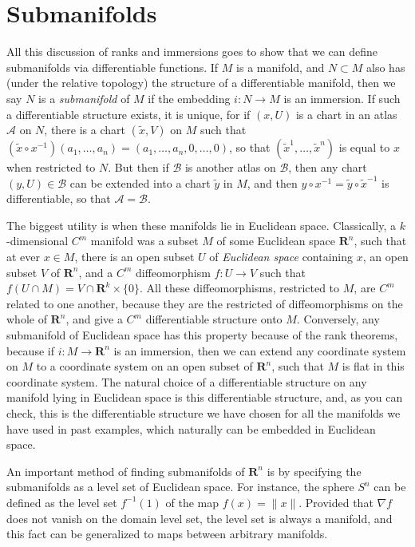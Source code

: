 \section{Submanifolds}

All this discussion of ranks and immersions goes to show that we can define submanifolds via differentiable functions. If $M$ is a manifold, and $N \subset M$ also has (under the relative topology) the structure of a differentiable manifold, then we say $N$ is a \emph{submanifold} of $M$ if the embedding $i: N \to M$ is an immersion. If such a differentiable structure exists, it is unique, for if $(x,U)$ is a chart in an atlas $\mathcal{A}$ on $N$, there is a chart $(\tilde{x},V)$ on $M$ such that $(\tilde{x} \circ x^{-1})(a_1, \dots, a_n) = (a_1, \dots, a_n, 0, \dots, 0)$, so that $(\tilde{x}^1, \dots, \tilde{x}^n)$ is equal to $x$ when restricted to $N$. But then if $\mathcal{B}$ is another atlas on $\mathcal{B}$, then any chart $(y,U) \in \mathcal{B}$ can be extended into a chart $\tilde{y}$ in $M$, and then $y \circ x^{-1} = \tilde{y} \circ \tilde{x}^{-1}$ is differentiable, so that $\mathcal{A} = \mathcal{B}$.

\begin{example}
    The biggest utility is when these manifolds lie in Euclidean space. Classically, a $k$-dimensional $C^m$ manifold was a subset $M$ of some Euclidean space $\mathbf{R}^n$, such that at ever $x \in M$, there is an open subset $U$ of {\it Euclidean space} containing $x$, an open subset $V$ of $\mathbf{R}^n$, and a $C^m$ diffeomorphism $f: U \to V$ such that $f(U \cap M) = V \cap \mathbf{R}^k \times \{ 0 \}$. All these diffeomorphisms, restricted to $M$, are $C^m$ related to one another, because they are the restricted of diffeomorphisms on the whole of $\mathbf{R}^n$, and give a $C^m$ differentiable structure onto $M$. Conversely, any submanifold of Euclidean space has this property because of the rank theorems, because if $i: M \to \mathbf{R}^n$ is an immersion, then we can extend any coordinate system on $M$ to a coordinate system on an open subset of $\mathbf{R}^n$, such that $M$ is flat in this coordinate system. The natural choice of a differentiable structure on any manifold lying in Euclidean space is this differentiable structure, and, as you can check, this is the differentiable structure we have chosen for all the manifolds we have used in past examples, which naturally can be embedded in Euclidean space.
\end{example}

An important method of finding submanifolds of $\mathbf{R}^n$ is by specifying the submanifolds as a level set of Euclidean space. For instance, the sphere $S^n$ can be defined as the level set $f^{-1}(1)$ of the map $f(x) = \| x \|$. Provided that $\nabla f$ does not vanish on the domain level set, the level set is always a manifold, and this fact can be generalized to maps between arbitrary manifolds.

